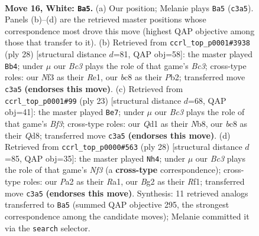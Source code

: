 \documentclass[11pt]{article}
\begin{document}
\clearpage

\begin{figure}[p]\centering
\begin{subfigure}{0.46\textwidth}\centering
\resizebox{\linewidth}{!}{%
\newchessgame
\chessboard[
  setfen={r1bnrk2/1pppqppp/p7/3P4/4n3/2B1PNP1/PP3PBP/R2Q1R1K w - - 7 16},
  showmover=false,
  pgfstyle=straightmove, color=movearrow, markmove={c3-a5}
]}
\caption{}
\end{subfigure}\hfill
\begin{subfigure}{0.46\textwidth}\centering
\resizebox{\linewidth}{!}{%
\newchessgame
\chessboard[
  setfen={r2q1rk1/pbpn1ppp/1p2p3/8/2PPn3/2B2NP1/PP3PBP/R2QR1K1 w - - 1 15},
  showmover=false,
  pgfstyle=straightmove, color=movearrow, markmove={c3-b4}
]}
\caption{}
\end{subfigure}
\\[4pt]
\begin{subfigure}{0.46\textwidth}\centering
\resizebox{\linewidth}{!}{%
\newchessgame
\chessboard[
  setfen={rn1q1rk1/pb3pp1/1p1ppb1p/8/2PPN3/3B1N2/PP3PPP/R2QR1K1 b - - 1 12},
  showmover=false,
  pgfstyle=straightmove, color=movearrow, markmove={f6-e7}
]}
\caption{}
\end{subfigure}\hfill
\begin{subfigure}{0.46\textwidth}\centering
\resizebox{\linewidth}{!}{%
\newchessgame
\chessboard[
  setfen={r1b1qrk1/1pp3pp/2n5/p1P1p3/6n1/P1BP1NP1/4PPB1/R2Q1RK1 w - - 1 15},
  showmover=false,
  pgfstyle=straightmove, color=movearrow, markmove={f3-h4}
]}
\caption{}
\end{subfigure}
\caption{\textbf{Move 16, White: \texttt{Ba5}.} (a) Our position; Melanie plays \texttt{Ba5} (\texttt{c3a5}). Panels (b)--(d) are the retrieved master positions whose correspondence most drove this move (highest QAP objective among those that transfer to it). (b) Retrieved from \texttt{ccrl\_top\_p0001\#3938} (ply 28) [structural distance $d$=81, QAP obj=58]: the master played \texttt{Bb4}; under $\mu$ our \emph{Bc3} plays the role of that game's \emph{Bc3}; cross-type roles: our \emph{N}f3 as their \emph{R}e1, our \emph{b}c8 as their \emph{P}b2; transferred move \texttt{c3a5} \textbf{(endorses this move)}. (c) Retrieved from \texttt{ccrl\_top\_p0001\#99} (ply 23) [structural distance $d$=68, QAP obj=41]: the master played \texttt{Be7}; under $\mu$ our \emph{Bc3} plays the role of that game's \emph{Bf3}; cross-type roles: our \emph{Q}d1 as their \emph{N}b8, our \emph{b}c8 as their \emph{Q}d8; transferred move \texttt{c3a5} \textbf{(endorses this move)}. (d) Retrieved from \texttt{ccrl\_top\_p0000\#563} (ply 28) [structural distance $d$=85, QAP obj=35]: the master played \texttt{Nh4}; under $\mu$ our \emph{Bc3} plays the role of that game's \emph{Nf3} (a \textbf{cross-type} correspondence); cross-type roles: our \emph{P}a2 as their \emph{R}a1, our \emph{B}g2 as their \emph{R}f1; transferred move \texttt{c3a5} \textbf{(endorses this move)}. Synthesis: 11 retrieved analogs transferred to \texttt{Ba5} (summed QAP objective 295, the strongest correspondence among the candidate moves); Melanie committed it via the \texttt{search} selector.}
\label{fig:thought-m30}
\end{figure}
\end{document}
